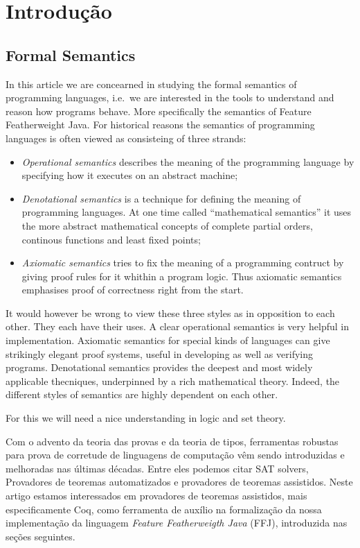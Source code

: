 \chapter{Introdução}

\section{Formal Semantics} In this article we are concearned in studying the
formal semantics of programming languages, i.e.\ we are interested in the tools
to understand and reason how programs behave. More specifically the semantics of
Feature Featherweight Java.  For historical reasons the semantics of programming
languages is often viewed as consisteing of three strands: 

\begin{itemize} 
    \item \textit{Operational semantics} describes the meaning of the
        programming language by specifying how it executes on an abstract machine;

    \item \textit{Denotational semantics} is a technique for defining the
    meaning of programming languages. At one time called ``mathematical
    semantics'' it uses the more abstract mathematical concepts of complete
    partial orders, continous functions and least fixed points; 

    \item \textit{Axiomatic semantics} tries to fix the meaning of a programming
        contruct by giving proof rules for it whithin a program logic. Thus
        axiomatic semantics emphasises proof of correctness right from the start.
\end{itemize}

It would however be wrong to view these three styles as in opposition to
each other. They each have their uses. A clear operational semantics is very
helpful in implementation. Axiomatic semantics for special kinds of
languages can give strikingly elegant proof systems, useful in developing as
well as verifying programs. Denotational semantics provides the deepest and
most widely applicable thecniques, underpinned by a rich mathematical
theory. Indeed, the different styles  of semantics are highly dependent on
each other. 

For this we will need a nice understanding in logic and set theory.

Com o advento da teoria das provas e da teoria de tipos\cite{martinlof},
ferramentas robustas para prova de corretude de linguagens de computação vêm
sendo introduzidas e melhoradas nas últimas décadas. Entre eles podemos citar
SAT solvers, Provadores de teoremas automatizados e provadores de teoremas
assistidos.  Neste artigo estamos interessados em provadores de teoremas
assistidos, mais especificamente Coq, como ferramenta de auxílio na formalização
da nossa implementação da linguagem \textit{Feature Featherweigth Java} (FFJ),
introduzida nas seções seguintes. 

